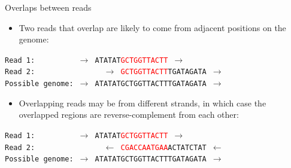 \documentclass[xcolor=dvipsnames]{beamer}
\begin{document}
\begin{frame}{Overlaps between reads}

    \begin{itemize}
    \item Two reads that overlap are likely to come from adjacent positions on
          the genome:
    \end{itemize}

    {\tt Read 1: \ \ \ \ \ \ \ \ \ $\rightarrow$
        ATATAT\textcolor{red}{GCTGGTTACTT} $\rightarrow$ } \\
    {\tt Read 2: \ \ \ \ \ \ \ \ \ \ \ \ \ \ \ $\rightarrow$
        \textcolor{red}{GCTGGTTACTT}TGATAGATA $\rightarrow$ } \\
    {\tt Possible genome: $\rightarrow$ ATATATGCTGGTTACTTTGATAGATA $\rightarrow$}

    \begin{itemize}
    \item Overlapping reads may be from different strands, in which case the
          overlapped regions are reverse-complement from each other:
    \end{itemize}

    {\tt Read 1: \ \ \ \ \ \ \ \ \ $\rightarrow$
        ATATAT\textcolor{red}{GCTGGTTACTT} $\rightarrow$ } \\
    {\tt Read 2: \ \ \ \ \ \ \ \ \ \ \ \ \ \ \ $\leftarrow$
        \textcolor{red}{CGACCAATGAA}ACTATCTAT $\leftarrow$ } \\
    {\tt Possible genome: $\rightarrow$ ATATATGCTGGTTACTTTGATAGATA $\rightarrow$}
\end{frame}
\end{document}
